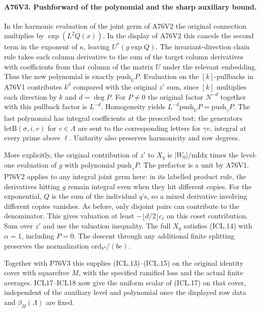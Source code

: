 \paragraph{A76V3. Pushforward of the polynomial and the sharp auxiliary bound.}
In the harmonic evaluation of the joint germ of A76V2 the
original connection multiplies by $\exp(L^2Q(x))$. In the
display of A76V2 this cancels the second term in the exponent
of $\kappa$, leaving $U^*(g\exp Q)$. The invariant-direction
chain rule takes each column derivative to the sum of the
target column derivatives with coefficients from that column of
the matrix $U$ under the relevant embedding. Thus the new
polynomial is exactly $\mathrm{push}_U P$. Evaluation on the
$[k]$-pullbacks in A76V1 contributes $k^d$ compared with
the original $z'$ sum, since $[k]$ multiplies each direction
by $k$ and $d=\deg P$. For $P\ne0$ the original factor
$N^{-d}$ together with this pullback factor is $L^{-d}$.
Homogeneity yields $L^{-d}\mathrm{push}_U P
=\mathrm{push}_\gamma P$. The last polynomial has integral
coefficients at the prescribed test: the generators
$\mathrm{letB}(\sigma,i,v)$ for $v\in\Lambda$ are sent to
the corresponding letters for $\gamma v$, integral at every
prime above $\ell$. Unitarity also preserves harmonicity
and row degrees.

More explicitly, the original contribution of $z'$ to $X_q$ is
$|W_0|/\mathrm{mIdx}$ times the level-one evaluation of $g$
with polynomial $\mathrm{push}_\gamma P$. The prefactor is a
unit by A76V1. P76V2 applies to any integral joint germ here:
in its labelled product rule, the derivatives hitting $g$
remain integral even when they hit different copies. For the
exponential, $Q$ is the sum of the individual $q$'s, so a
mixed derivative involving different copies vanishes. As
before, only disjoint pairs can contribute to the denominator.
This gives valuation at least $-\lfloor d/2\rfloor c_\ell$
on this coset contribution. Sum over $z'$ and use the
valuation inequality. The full $X_q$ satisfies (ICL.14)
with $\alpha=1$, including $P=0$. The descent through any
additional finite splitting preserves the normalization
$\mathrm{ord}_{V'}/(be)$.

Together with P76V3 this supplies (ICL.13)--(ICL.15) on the
original identity cover with squarefree $M$, with the
specified ramified loss and the actual finite averages.
ICL17--ICL18 now give the uniform scalar of (ICL.17) on
that cover, independent of the auxiliary level and polynomial
once the displayed row data and $\beta_H(\Lambda)$ are fixed.
